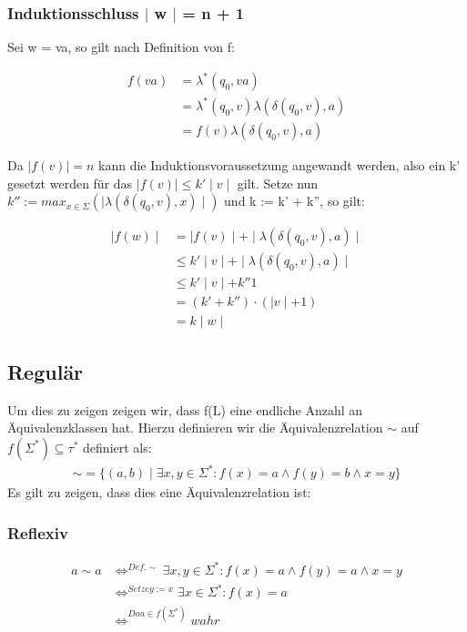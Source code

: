 \documentclass[12pt, a4paper]{article}
\begin{document}
\subsubsection*{Induktionsschluss $\mid$ w $\mid$ = n + 1}

Sei w = va, so gilt nach Definition von f:

\begin{align*}
f(va) &= \lambda^*(q_0, va) \\
&= \lambda^*(q_0, v) \lambda(\delta(q_0,v), a) \\
&= f(v)  \lambda(\delta(q_0,v), a)
\end{align*}

Da $\mid f(v) \mid = n$ kann die Induktionsvoraussetzung angewandt werden, also ein k' gesetzt werden für das $\mid f(v) \mid \le k' \mid v \mid$ gilt. Setze nun $k'' := max_{x \in \Sigma}(\mid \lambda(\delta(q_0,v),x) \mid )$ und k := k' + k'', so gilt:

\begin{align*}
\mid f(w) \mid &= \mid f(v) \mid + \mid \lambda(\delta(q_0,v),a) \mid \\
&\le k' \mid v \mid + \mid \lambda(\delta(q_0,v),a) \mid \\
&\le k' \mid v \mid + k'' 1 \\
&= (k' + k'') \cdot (\mid v \mid + 1) \\
&= k \mid w \mid
\end{align*}

\subsection*{Regulär}
Um dies zu zeigen zeigen wir, dass f(L) eine endliche Anzahl an Äquivalenzklassen hat. Hierzu definieren wir die Äquivalenzrelation $\sim$ auf $f(\Sigma^*)\subseteq \tau^*$ definiert als:
\begin{align*}
\sim = \{(a,b) \mid \exists x,y \in \Sigma^*: f(x) = a \wedge f(y) = b \wedge x = y \}
\end{align*}
Es gilt zu zeigen, dass dies eine Äquivalenzrelation ist:

\subsubsection*{Reflexiv}
\begin{align*}
a \sim a &\Longleftrightarrow^{Def. \sim} \exists x,y \in \Sigma^*: f(x) = a \wedge f(y) = a \wedge x = y \\
&\Longleftrightarrow^{Setze y := x} \exists x \in \Sigma^*: f(x) = a \\
&\Longleftrightarrow^{Da a \in f(\Sigma^*)} wahr
\end{align*}
\end{document}

